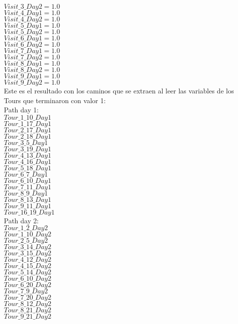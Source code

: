 $Visit\_3\_Day2 = 1.0$\\
$Visit\_4\_Day1 = 1.0$\\
$Visit\_4\_Day2 = 1.0$\\
$Visit\_5\_Day1 = 1.0$\\
$Visit\_5\_Day2 = 1.0$\\
$Visit\_6\_Day1 = 1.0$\\
$Visit\_6\_Day2 = 1.0$\\
$Visit\_7\_Day1 = 1.0$\\
$Visit\_7\_Day2 = 1.0$\\
$Visit\_8\_Day1 = 1.0$\\
$Visit\_8\_Day2 = 1.0$\\
$Visit\_9\_Day1 = 1.0$\\
$Visit\_9\_Day2 = 1.0$\\
Este es el resultado con los caminos que se extraen al leer las variables de los Tours que terminaron con valor 1: \\
Path day 1:\\
$Tour\_1\_10\_Day1$\\
$Tour\_1\_17\_Day1$\\
$Tour\_2\_17\_Day1$\\
$Tour\_2\_18\_Day1$\\
$Tour\_3\_5\_Day1$\\
$Tour\_3\_19\_Day1$\\
$Tour\_4\_13\_Day1$\\
$Tour\_4\_16\_Day1$\\
$Tour\_5\_18\_Day1$\\
$Tour\_6\_7\_Day1$\\
$Tour\_6\_10\_Day1$\\
$Tour\_7\_11\_Day1$\\
$Tour\_8\_9\_Day1$\\
$Tour\_8\_13\_Day1$\\
$Tour\_9\_11\_Day1$\\
$Tour\_16\_19\_Day1$ \\
Path day 2:\\
$Tour\_1\_2\_Day2$\\
$Tour\_1\_10\_Day2$\\
$Tour\_2\_5\_Day2$\\
$Tour\_3\_14\_Day2$\\
$Tour\_3\_15\_Day2$\\
$Tour\_4\_12\_Day2$\\
$Tour\_4\_15\_Day2$\\
$Tour\_5\_14\_Day2$\\
$Tour\_6\_10\_Day2$\\
$Tour\_6\_20\_Day2$\\
$Tour\_7\_9\_Day2$\\
$Tour\_7\_20\_Day2$\\
$Tour\_8\_12\_Day2$\\
$Tour\_8\_21\_Day2$\\
$Tour\_9\_21\_Day2$\\
